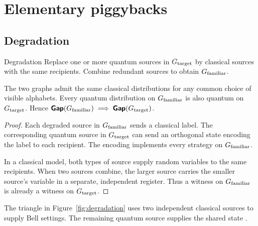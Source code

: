 \section{Elementary piggybacks}\label{sec:elementary}

\subsection{Degradation}\label{sec:degradation}
\begin{piggyback}{Degradation}
Replace one or more quantum sources in \(G_{\text{target}}\) by classical sources
with the same recipients. Combine redundant sources to obtain \(G_{\text{familiar}}\).
\end{piggyback}
\begin{proposition}\label{prop:degradation}
The two graphs admit the same classical distributions for any common choice
of visible alphabets. Every quantum distribution on \(G_{\text{familiar}}\) is also
quantum on \(G_{\text{target}}\). Hence \(\operatorname{\text{\normalfont\sffamily\bfseries Gap}}(G_{\text{familiar}})\implies\operatorname{\text{\normalfont\sffamily\bfseries Gap}}(G_{\text{target}})\).
\end{proposition}
\begin{proof}
Each degraded source in \(G_{\text{familiar}}\) sends a classical label. The
corresponding quantum source in \(G_{\text{target}}\) can send an orthogonal state
encoding the label to each recipient. The encoding implements every
strategy on \(G_{\text{familiar}}\).

In a classical model, both types of source supply random variables to the
same recipients. When two sources combine, the larger source carries the
smaller source's variable in a separate, independent register. Thus a
witness on \(G_{\text{familiar}}\) is already a witness on \(G_{\text{target}}\).
\end{proof}
The triangle in Figure~\ref{fig:degradation} uses two independent classical
sources to supply Bell settings. The remaining quantum source supplies the
shared state \cite{Fritz}.

